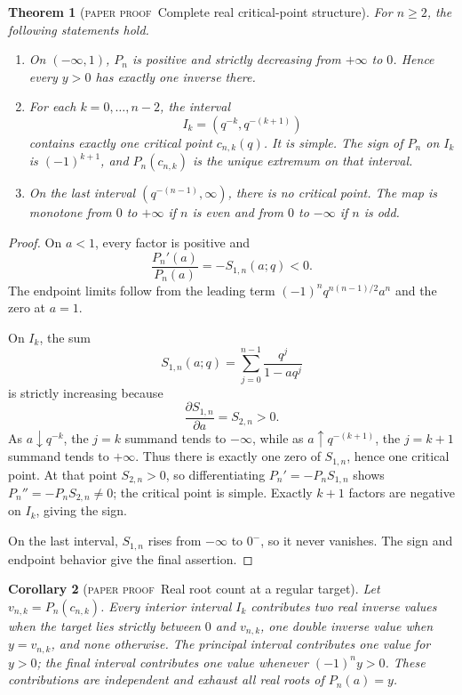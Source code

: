 \documentclass[11pt,oneside]{article}
\newtheorem{theorem}{Theorem}[section]
\newtheorem{corollary}[theorem]{Corollary}
\theoremstyle{definition}
\theoremstyle{remark}
\theoremstyle{plain}
\theoremstyle{definition}
\theoremstyle{remark}
\newcommand{\statusproved}{\textcolor{provedgreen}{\textsc{paper proof}}}
\numberwithin{equation}{section}
\numberwithin{figure}{section}
\numberwithin{table}{section}
\begin{document}
\begin{theorem}[\statusproved\ Complete real critical-point structure]
For \(n\ge2\), the following statements hold.
\begin{enumerate}[label=(\roman*)]
\item On \(( -\infty,1)\), \(P_n\) is positive and strictly decreasing from
\(+\infty\) to \(0\).  Hence every \(y>0\) has exactly one inverse there.
\item For each \(k=0,\ldots,n-2\), the interval
\[
 I_k=(q^{-k},q^{-(k+1)})
\]
contains exactly one critical point \(c_{n,k}(q)\).  It is simple.  The sign of
\(P_n\) on \(I_k\) is \((-1)^{k+1}\), and \(P_n(c_{n,k})\) is the unique
extremum on that interval.
\item On the last interval \((q^{-(n-1)},\infty)\), there is no critical point.
The map is monotone from \(0\) to \(+\infty\) if \(n\) is even and from \(0\)
to \(-\infty\) if \(n\) is odd.
\end{enumerate}
\end{theorem}
\begin{proof}
On \(a<1\), every factor is positive and
\[
 \frac{P_n'(a)}{P_n(a)}
 =-S_{1,n}(a;q)<0.
\]
The endpoint limits follow from the leading term
\((-1)^nq^{n(n-1)/2}a^n\) and the zero at \(a=1\).

On \(I_k\), the sum
\[
 S_{1,n}(a;q)=\sum_{j=0}^{n-1}\frac{q^j}{1-aq^j}
\]
is strictly increasing because
\[
 \frac{\partial S_{1,n}}{\partial a}=S_{2,n}>0.
\]
As \(a\downarrow q^{-k}\), the \(j=k\) summand tends to \(-\infty\), while as
\(a\uparrow q^{-(k+1)}\), the \(j=k+1\) summand tends to \(+\infty\).  Thus
there is exactly one zero of \(S_{1,n}\), hence one critical point.  At that
point \(S_{2,n}>0\), so differentiating \(P_n'=-P_nS_{1,n}\) shows
\(P_n''=-P_nS_{2,n}\ne0\); the critical point is simple.  Exactly \(k+1\)
factors are negative on \(I_k\), giving the sign.

On the last interval, \(S_{1,n}\) rises from \(-\infty\) to \(0^-\), so it
never vanishes.  The sign and endpoint behavior give the final assertion.
\end{proof}

\begin{corollary}[\statusproved\ Real root count at a regular target]
Let \(v_{n,k}=P_n(c_{n,k})\).  Every interior interval \(I_k\) contributes two
real inverse values when the target lies strictly between \(0\) and
\(v_{n,k}\), one double inverse value when \(y=v_{n,k}\), and none otherwise.
The principal interval contributes one value for \(y>0\); the final interval
contributes one value whenever \((-1)^ny>0\).  These contributions are
independent and exhaust all real roots of \(P_n(a)=y\).
\end{corollary}
\end{document}
